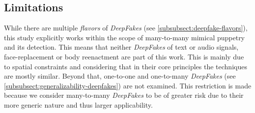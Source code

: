 \subsection{Limitations}\label{subsect:limitations}
While there are multiple \textit{flavors} of \textit{DeepFakes} (see \cref{subsubsect:deepfake-flavors}),
this study explicitly works within the scope of many-to-many mimical puppetry and its
detection. This means that neither \textit{DeepFakes} of text or audio signals,
face-replacement or body reenactment are part of this work. This is mainly
due to spatial constraints and considering that in their core principles the techniques are mostly
similar. Beyond that, one-to-one and one-to-many \textit{DeepFakes} (see \cref{subsubsect:generalizability-deepfakes})
are not examined. This restriction is made because we consider many-to-many \textit{DeepFakes}
to be of greater risk due to their more generic nature and thus larger applicability.

